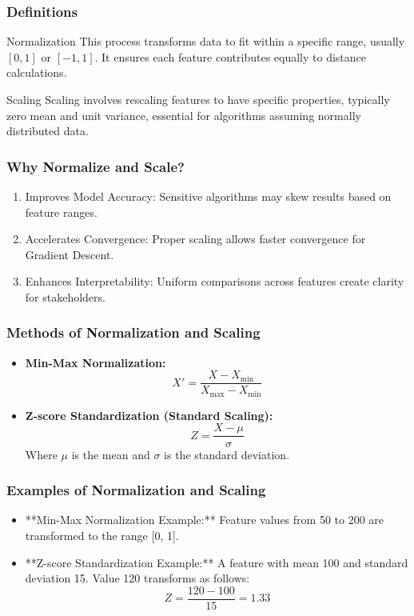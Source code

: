 \documentclass[aspectratio=169]{beamer}
\begin{document}
\begin{frame}
    \frametitle{Definitions}
    \begin{block}{Normalization}
        This process transforms data to fit within a specific range, usually $[0, 1]$ or $[-1, 1]$. It ensures each feature contributes equally to distance calculations.
    \end{block}
    
    \begin{block}{Scaling}
        Scaling involves rescaling features to have specific properties, typically zero mean and unit variance, essential for algorithms assuming normally distributed data.
    \end{block}
\end{frame}

\begin{frame}
    \frametitle{Why Normalize and Scale?}
    \begin{enumerate}
        \item Improves Model Accuracy: Sensitive algorithms may skew results based on feature ranges.
        \item Accelerates Convergence: Proper scaling allows faster convergence for Gradient Descent.
        \item Enhances Interpretability: Uniform comparisons across features create clarity for stakeholders.
    \end{enumerate}
\end{frame}

\begin{frame}
    \frametitle{Methods of Normalization and Scaling}
    \begin{itemize}
        \item \textbf{Min-Max Normalization:}
        \begin{equation}
        X' = \frac{X - X_{\text{min}}}{X_{\text{max}} - X_{\text{min}}}
        \end{equation}
        \item \textbf{Z-score Standardization (Standard Scaling):}
        \begin{equation}
        Z = \frac{X - \mu}{\sigma}
        \end{equation}
        Where $\mu$ is the mean and $\sigma$ is the standard deviation.
    \end{itemize}
\end{frame}

\begin{frame}
    \frametitle{Examples of Normalization and Scaling}
    \begin{itemize}
        \item **Min-Max Normalization Example:** Feature values from 50 to 200 are transformed to the range [0, 1].
        \item **Z-score Standardization Example:** A feature with mean 100 and standard deviation 15. Value 120 transforms as follows:
        \begin{equation}
        Z = \frac{120 - 100}{15} = 1.33
        \end{equation}
    \end{itemize}
\end{frame}
\end{document}
